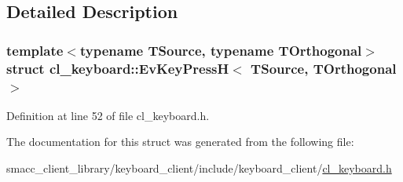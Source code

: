 \subsection{Detailed Description}
\subsubsection*{template$<$typename T\+Source, typename T\+Orthogonal$>$\newline
struct cl\+\_\+keyboard\+::\+Ev\+Key\+Press\+H$<$ T\+Source, T\+Orthogonal $>$}



Definition at line 52 of file cl\+\_\+keyboard.\+h.



The documentation for this struct was generated from the following file\+:\begin{DoxyCompactItemize}
\item 
smacc\+\_\+client\+\_\+library/keyboard\+\_\+client/include/keyboard\+\_\+client/\hyperlink{cl__keyboard_8h}{cl\+\_\+keyboard.\+h}\end{DoxyCompactItemize}

